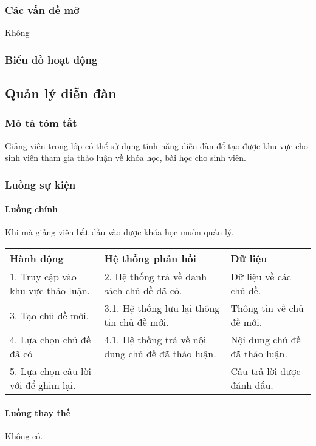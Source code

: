 \documentclass[./../main_file.tex]{subfiles}
\begin{document}
\subsubsection{Các vấn đề mở}
Không

\subsubsection{Biểu đồ hoạt động}

\subsection{Quản lý diễn đàn}

\subsubsection{Mô tả tóm tắt}
Giảng viên trong lớp có thể sử dụng tính năng diễn đàn để tạo được khu vực cho sinh viên tham gia thảo luận về khóa học, bài học cho sinh viên. 

\subsubsection{Luồng sự kiện}
\paragraph{Luồng chính}
Khi mà giảng viên bắt đầu vào được khóa học muốn quản lý.
\begin{longtable}{|p{}|p{}|p{}|}
		\hline
		\textbf{Hành động}                   & \textbf{Hệ thống phản hồi} & \textbf{Dữ liệu}           \\ \hline
		1. Truy cập vào khu vực thảo luận. & 2. Hệ thống trả về danh sách chủ đề đã có.         & Dữ liệu về các chủ đề.        \\ \hline
		3. Tạo chủ đề mới.                 & 3.1. Hệ thống lưu lại thông tin chủ đề mới.        & Thông tin về chủ đề mới.      \\ \hline
		4. Lựa chọn chủ đề đã có           & 4.1. Hệ thống trả về nội dung chủ đề đã thảo luận. & Nội dung chủ đề đã thảo luận. \\ \hline
		5. Lựa chọn câu lời với để ghim lại. &                            & Câu trả lời được đánh dấu. \\ \hline
\end{longtable}
\paragraph{Luồng thay thế}
	Không có.
\end{document}
